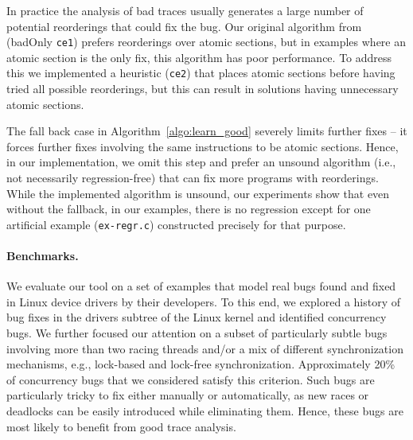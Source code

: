 \documentclass{llncs}
\begin{document}
In practice the analysis of bad traces usually generates a large number
of potential reorderings that could fix the bug.
Our original algorithm from~\cite{cav2013} (badOnly {\tt ce1}) prefers
reorderings over atomic sections, but in examples where an atomic
section is the only fix, this algorithm has poor performance.
To address this we implemented a heuristic ({\tt ce2}) that places
atomic sections before having tried all possible reorderings, but this
can result in solutions having unnecessary atomic sections.

The fall back case in Algorithm~\ref{algo:learn_good} severely limits
further fixes -- it forces further fixes involving the same instructions
to be atomic sections.
Hence, in our implementation, we omit this step and prefer an unsound
algorithm (i.e., not necessarily regression-free) that can fix more
programs with reorderings.
While the implemented algorithm is unsound, our experiments show that
even without the fallback, in our examples, there is no regression
except for one artificial example ({\tt ex-regr.c}) constructed
precisely for that purpose.

\vspace{-1ex}
\paragraph{Benchmarks.}
We evaluate our tool on a set of examples that model real bugs found and 
fixed in Linux device drivers by their developers.  
To this end, we explored a history of bug fixes in the drivers subtree
of the Linux kernel and identified concurrency bugs.
We further focused our attention on a subset of 
particularly subtle bugs involving more than two racing threads 
and/or a mix of different synchronization mechanisms, e.g., lock-based 
and lock-free synchronization.  
Approximately 20\% of concurrency bugs that we considered satisfy this
criterion.
Such bugs are particularly tricky to fix either manually or
automatically, as new races or deadlocks can be easily introduced while
eliminating them.
Hence, these bugs are most likely to benefit from good trace analysis.
\end{document}

